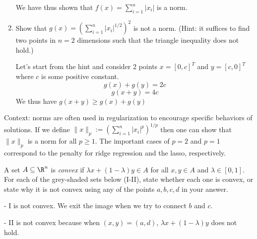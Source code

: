 \documentclass{article}
\begin{document}
\begin{aprob}
\begin{enumerate}
      
      We have thus shown that $f(x) = \sum_{i=1}^{n} |x_i| $ is a norm.
      
      \item {} Show that $g(x) = \left(\sum_{i=1}^n |x_i|^{1/2}\right)^2$ is not a norm. (Hint: it suffices to find two points in $n=2$ dimensions such that the triangle inequality does not hold.)
      
      Let's start from the hint and consider 2 points $ x = [0,c]^T$ and $y = [c,0]^T$ where $c$ is some positive constant.
      \begin{equation}
      g(x) + g(y) = 2c
      \end{equation}
      \begin{equation}
      g(x+y) = 4c
      \end{equation}
      We thus have $g(x+y) \geq g(x) + g(y)$
      
    \end{enumerate} 
    Context: norms are often used in regularization to encourage specific behaviors of solutions. If we define  $\| x \|_p := \left( \sum_{i=1}^n |x_i|^{p} \right)^{1/p}$ then one can show that $\| x \|_p$ is a norm for all $p \geq 1$. The important cases of $p=2$ and $p=1$ correspond to the penalty for ridge regression and the lasso, respectively. \\

\end{aprob}
\newpage 

\begin{aprob}
     A set $A \subseteq \R^n$ is \emph{convex} if $\lambda x + (1-\lambda) y \in A$ for all $x,y\in A$ and $\lambda \in [0,1]$.
    For each of the grey-shaded sets below (I-II), state whether each one is convex, or state why it is not convex using any of the points $a,b,c,d$ in your answer. 
    
    
    - I is not convex. We exit the image when we try to connect $b$ and $c$.
    
    - II is not convex because when $(x,y) = (a,d)$, $\lambda x + (1-\lambda) y$ does not hold.

\end{aprob}
\end{document}
